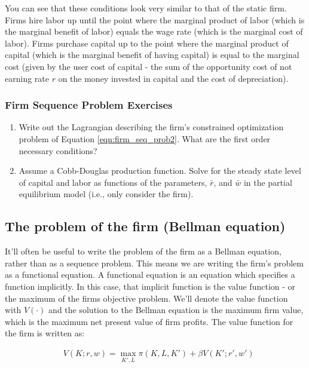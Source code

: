 \documentclass[letterpaper,12pt]{article}
\theoremstyle{definition}
\begin{document}
\begin{spacing}{1.5}
You can see that these conditions look very similar to that of the static firm.  Firms hire labor up until the point where the marginal product of labor (which is the marginal benefit of labor) equals the wage rate (which is the marginal cost of labor).  Firms purchase capital up to the point where the marginal product of capital (which is the marginal benefit of having capital) is equal to the marginal cost (given by the user cost of capital - the sum of the opportunity cost of not earning rate $r$ on the money invested in capital and the cost of depreciation).

\subsubsection*{Firm Sequence Problem Exercises}

\begin{enumerate}
\item Write out the Lagrangian describing the firm's constrained optimization problem of Equation \ref{eqn:firm_seq_prob2}.  What are the first order necessary conditions?
\item Assume a Cobb-Douglas production function.  Solve for the steady state level of capital and labor as functions of the parameters, $\bar{r}$, and $\bar{w}$ in the partial equilibrium model (i.e., only consider the firm).
\end{enumerate}

\subsection*{The problem of the firm (Bellman equation)}

It'll often be useful to write the problem of the firm as a Bellman equation, rather than as a sequence problem.  This means we are writing the firm's problem as a functional equation.  A functional equation is an equation which specifies a function implicitly.  In this case, that implicit function is the value function - or the maximum of the firms objective problem.  We'll denote the value function with $V(\cdot)$ and the solution to the Bellman equation is the maximum firm value, which is the maximum net present value of firm profits.  The value function for the firm is written as:

\begin{equation}
\label{eqn:firm_bellman}
\begin{split}
& V(K; r, w) = \max_{K', L} \pi(K,L,K') + \beta V(K'; r', w') \\
\end{split}
\end{equation}


\end{spacing}
\end{document}
